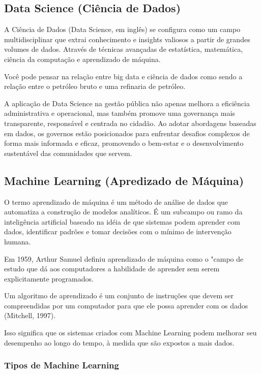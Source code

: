 \subsection{Data Science (Ciência de Dados)}

A Ciência de Dados (Data Science, em inglês) se configura como um campo multidisciplinar que extrai conhecimento e insights valiosos a partir de grandes volumes de dados. Através de técnicas avançadas de estatística, matemática, ciência da computação e aprendizado de máquina.\vskip0.3cm

Você pode pensar na relação entre big data e ciência de dados como sendo a relação entre o petróleo bruto e uma refinaria de petróleo.\vskip0.3cm

A aplicação de Data Science na gestão pública não apenas melhora a eficiência administrativa e operacional, mas também promove uma governança mais transparente, responsável e centrada no cidadão. Ao adotar abordagens baseadas em dados, os governos estão posicionados para enfrentar desafios complexos de forma mais informada e eficaz, promovendo o bem-estar e o desenvolvimento sustentável das comunidades que servem.


\subsection{Machine Learning (Apredizado de Máquina)}

O termo aprendizado de máquina é um método de análise de dados que automatiza a construção de modelos analíticos. É um subcampo ou ramo da inteligência artificial baseado na idéia de que sistemas podem aprender com dados, identificar padrões e tomar decisões com o mínimo de intervenção humana.\vskip0.3cm

Em 1959, Arthur Samuel definiu aprendizado de máquina como o "campo de estudo que dá aos computadores a habilidade de aprender sem serem explicitamente programados.\vskip0.3cm

Um algoritmo de aprendizado é um conjunto de instruções que devem ser compreendidas por um computador para que ele possa aprender com os dados (Mitchell, 1997).\vskip0.3cm

Isso significa que os sistemas criados com Machine Learning podem melhorar seu desempenho ao longo do tempo, à medida que são expostos a mais dados.\vskip0.3cm

\subsubsection{Tipos de Machine Learning}

